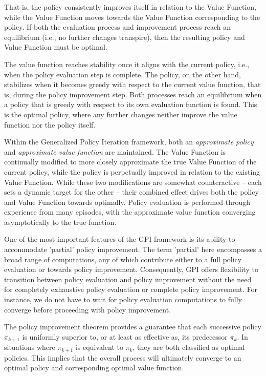 That is, the policy consistently improves itself in relation to the Value Function, while the Value Function moves towards the Value Function corresponding to the policy.
If both the evaluation process and improvement process reach an equilibrium (i.e., no further changes transpire), then the resulting policy and Value Function must be optimal. 

The value function reaches stability once it aligns with the current policy, i.e., when the policy evaluation step is complete. The policy, on the other hand, stabilizes when it becomes greedy with respect to the current value function, that is, during the policy improvement step. Both processes reach an equilibrium when a policy that is greedy with respect to its own evaluation function is found. This is the optimal policy, where any further changes neither improve the value function nor the policy itself.

Within the Generalized Policy Iteration framework, both an \textit{approximate policy} and \textit{approximate value function} are maintained. The Value Function is continually modified to more closely approximate the true Value Function of the current policy, while the policy is perpetually improved in relation to the existing Value Function.  While these two modifications are somewhat counteractive -- each sets a dynamic target for the other --  their combined effect drives both the policy and Value Function towards optimally. 
Policy evaluation is performed through experience from many episodes, with the approximate value function converging asymptotically to the true function.


One of the most important features of the GPI framework is its ability to accommodate 'partial' policy improvement. The term 'partial' here encompasses a broad range of computations, any of which contribute either to a full policy evaluation or towards policy improvement. Consequently, GPI offers flexibility to transition between policy evaluation and policy improvement without the need for completely exhaustive policy evaluation or complete policy improvement. For instance, we do not have to wait for policy evaluation computations to fully converge before proceeding with policy improvement.


The policy improvement theorem provides a guarantee that each successive policy $\pi_{k+1}$ is uniformly superior to, or at least as effective as, its predecessor $\pi_{k}$. In situations where $\pi_{k+1}$ is equivalent  to $\pi_{k}$, they are both classified as optimal policies. This implies that the overall process will ultimately converge to an optimal policy and corresponding optimal value function. 

